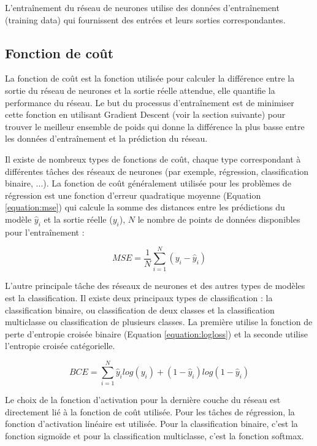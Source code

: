 L'entraînement du réseau de neurones utilise des données d'entraînement (training data) qui fournissent des entrées et leurs sorties correspondantes.

\subsection{Fonction de coût}
La fonction de coût est la fonction utilisée pour calculer la différence entre la sortie du réseau de neurones et la sortie réelle attendue, elle quantifie la performance du réseau. Le but du processus d'entraînement est de minimiser cette fonction en utilisant Gradient Descent (voir la section suivante) pour trouver le meilleur ensemble de poids qui donne la différence la plus basse entre les données d'entraînement et la prédiction du réseau.

Il existe de nombreux types de fonctions de coût, chaque type correspondant à différentes tâches des réseaux de neurones (par exemple, régression, classification binaire, ...). La fonction de coût généralement utilisée pour les problèmes de régression est une fonction d'erreur quadratique moyenne (Equation \ref{equation:mse}) qui calcule la somme des distances entre les prédictions du modèle $\hat{y}_i$ et la sortie réelle ($y_i$), $N$ le nombre de points de données disponibles pour l'entraînement :

\begin{equation}
    MSE=\frac{1}{N}\sum_{i=1}^N(y_i-\hat{y}_i)
    \label{equation:mse}
\end{equation}

L'autre principale tâche des réseaux de neurones et des autres types de modèles est la classification. Il existe deux principaux types de classification : la classification binaire, ou classification de deux classes et la classification multiclasse ou classification de plusieurs classes. La première utilise la fonction de perte d'entropie croisée binaire (Equation \ref{equation:logloss}) et la seconde utilise l'entropie croisée catégorielle.

\begin{equation}
    BCE = \sum_{i=1}^{N}\hat{y}_i log(y_i)+(1-\hat{y}_i)log(1-\hat{y}_i)
    \label{equation:logloss}
\end{equation}

Le choix de la fonction d'activation pour la dernière couche du réseau est directement lié à la fonction de coût utilisée. Pour les tâches de régression, la fonction d'activation linéaire est utilisée. Pour la classification binaire, c'est la fonction sigmoïde et pour la classification multiclasse, c'est la fonction softmax.

